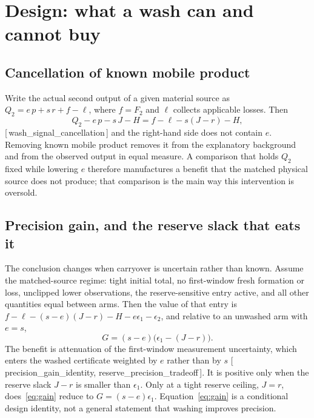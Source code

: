 \documentclass[11pt]{article}
\theoremstyle{plain}
\theoremstyle{definition}
\theoremstyle{remark}
\newcommand{\leanref}[1]{{\normalfont\sffamily\footnotesize[\,#1\,]}}
\begin{document}
\section{Design: what a wash can and cannot buy}\label{sec:wash}

\subsection{Cancellation of known mobile product}

Write the actual second output of a given material source as
$Q_2=e\,p+s\,r+f-\ell$, where $f=F_2$ and $\ell$ collects applicable losses.
Then
\begin{equation}
 Q_2-e\,p-s\,J-H=f-\ell-s(J-r)-H ,
 \label{eq:cancel}
\end{equation}
\leanref{wash\_signal\_cancellation} and the right-hand side does not contain
$e$. Removing known mobile product removes it from the explanatory background
and from the observed output in equal measure. A comparison that holds $Q_2$
fixed while lowering $e$ therefore manufactures a benefit that the matched
physical source does not produce; that comparison is the main way this
intervention is oversold.

\subsection{Precision gain, and the reserve slack that eats it}

The conclusion changes when carryover is uncertain rather than known. Assume
the matched-source regime: tight initial total, no first-window fresh
formation or loss, unclipped lower observations, the reserve-sensitive entry
active, and all other quantities equal between arms. Then the value of that
entry is $f-\ell-(s-e)(J-r)-H-e\epsilon_1-\epsilon_2$, and relative to an
unwashed arm with $e=s$,
\begin{equation}
 G=(s-e)\bigl(\epsilon_1-(J-r)\bigr) .
 \label{eq:gain}
\end{equation}
The benefit is attenuation of the first-window measurement uncertainty, which
enters the washed certificate weighted by $e$ rather than by $s$
\leanref{precision\_gain\_identity, reserve\_precision\_tradeoff}. It is
positive only when the reserve slack $J-r$ is smaller than $\epsilon_1$. Only
at a tight reserve ceiling, $J=r$, does~\eqref{eq:gain} reduce to
$G=(s-e)\epsilon_1$. Equation~\eqref{eq:gain} is a conditional design
identity, not a general statement that washing improves precision.
\end{document}
